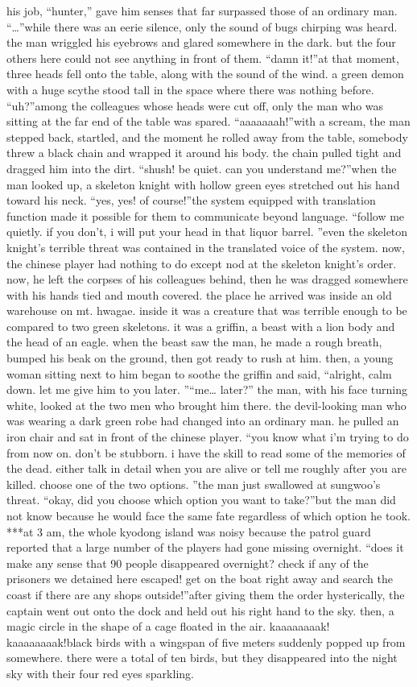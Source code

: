 his job, “hunter,” gave him senses that far surpassed those of an ordinary man.
“…”while there was an eerie silence, only the sound of bugs chirping was heard.
the man wriggled his eyebrows and glared somewhere in the dark.
but the four others here could not see anything in front of them.
“damn it!”at that moment, three heads fell onto the table, along with the sound of the wind.
a green demon with a huge scythe stood tall in the space where there was nothing before.
“uh?”among the colleagues whose heads were cut off, only the man who was sitting at the far end of the table was spared.
“aaaaaaah!”with a scream, the man stepped back, startled, and the moment he rolled away from the table, somebody threw a black chain and wrapped it around his body.
the chain pulled tight and dragged him into the dirt.
“shush! be quiet.
 can you understand me?”when the man looked up, a skeleton knight with hollow green eyes stretched out his hand toward his neck.
“yes, yes! of course!”the system equipped with translation function made it possible for them to communicate beyond language.
“follow me quietly.
 if you don’t, i will put your head in that liquor barrel.
”even the skeleton knight’s terrible threat was contained in the translated voice of the system.
 now, the chinese player had nothing to do except nod at the skeleton knight’s order.
now, he left the corpses of his colleagues behind, then he was dragged somewhere with his hands tied and mouth covered.
 the place he arrived was inside an old warehouse on mt.
 hwagae.
 inside it was a creature that was terrible enough to be compared to two green skeletons.
it was a griffin, a beast with a lion body and the head of an eagle.
when the beast saw the man, he made a rough breath, bumped his beak on the ground, then got ready to rush at him.
then, a young woman sitting next to him began to soothe the griffin and said, “alright, calm down.
 let me give him to you later.
”“me… later?” the man, with his face turning white, looked at the two men who brought him there.
 the devil-looking man who was wearing a dark green robe had changed into an ordinary man.
he pulled an iron chair and sat in front of the chinese player.
“you know what i’m trying to do from now on.
 don’t be stubborn.
 i have the skill to read some of the memories of the dead.
 either talk in detail when you are alive or tell me roughly after you are killed.
 choose one of the two options.
”the man just swallowed at sungwoo’s threat.
“okay, did you choose which option you want to take?”but the man did not know because he would face the same fate regardless of which option he took.
***at 3 am, the whole kyodong island was noisy because the patrol guard reported that a large number of the players had gone missing overnight.
“does it make any sense that 90 people disappeared overnight? check if any of the prisoners we detained here escaped! get on the boat right away and search the coast if there are any shops outside!”after giving them the order hysterically, the captain went out onto the dock and held out his right hand to the sky.
 then, a magic circle in the shape of a cage floated in the air.
kaaaaaaaak! kaaaaaaaak!black birds with a wingspan of five meters suddenly popped up from somewhere.
 there were a total of ten birds, but they disappeared into the night sky with their four red eyes sparkling.


